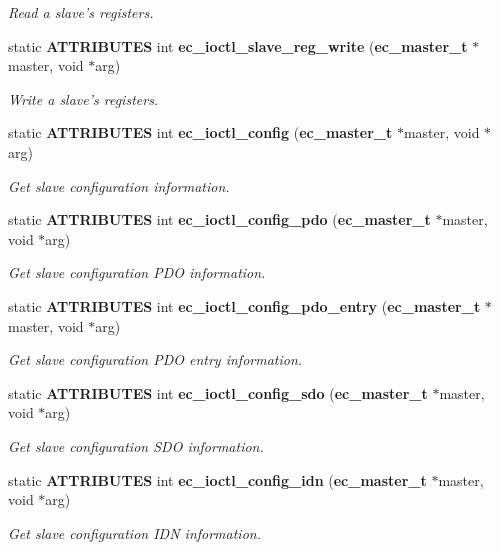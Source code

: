 \begin{DoxyCompactItemize}
\begin{DoxyCompactList}\small\item\em \-Read a slave's registers. \end{DoxyCompactList}\item 
static {\bf \-A\-T\-T\-R\-I\-B\-U\-T\-E\-S} int {\bf ec\-\_\-ioctl\-\_\-slave\-\_\-reg\-\_\-write} ({\bf ec\-\_\-master\-\_\-t} $\ast$master, void $\ast$arg)
\begin{DoxyCompactList}\small\item\em \-Write a slave's registers. \end{DoxyCompactList}\item 
static {\bf \-A\-T\-T\-R\-I\-B\-U\-T\-E\-S} int {\bf ec\-\_\-ioctl\-\_\-config} ({\bf ec\-\_\-master\-\_\-t} $\ast$master, void $\ast$arg)
\begin{DoxyCompactList}\small\item\em \-Get slave configuration information. \end{DoxyCompactList}\item 
static {\bf \-A\-T\-T\-R\-I\-B\-U\-T\-E\-S} int {\bf ec\-\_\-ioctl\-\_\-config\-\_\-pdo} ({\bf ec\-\_\-master\-\_\-t} $\ast$master, void $\ast$arg)
\begin{DoxyCompactList}\small\item\em \-Get slave configuration \-P\-D\-O information. \end{DoxyCompactList}\item 
static {\bf \-A\-T\-T\-R\-I\-B\-U\-T\-E\-S} int {\bf ec\-\_\-ioctl\-\_\-config\-\_\-pdo\-\_\-entry} ({\bf ec\-\_\-master\-\_\-t} $\ast$master, void $\ast$arg)
\begin{DoxyCompactList}\small\item\em \-Get slave configuration \-P\-D\-O entry information. \end{DoxyCompactList}\item 
static {\bf \-A\-T\-T\-R\-I\-B\-U\-T\-E\-S} int {\bf ec\-\_\-ioctl\-\_\-config\-\_\-sdo} ({\bf ec\-\_\-master\-\_\-t} $\ast$master, void $\ast$arg)
\begin{DoxyCompactList}\small\item\em \-Get slave configuration \-S\-D\-O information. \end{DoxyCompactList}\item 
static {\bf \-A\-T\-T\-R\-I\-B\-U\-T\-E\-S} int {\bf ec\-\_\-ioctl\-\_\-config\-\_\-idn} ({\bf ec\-\_\-master\-\_\-t} $\ast$master, void $\ast$arg)
\begin{DoxyCompactList}\small\item\em \-Get slave configuration \-I\-D\-N information. \end{DoxyCompactList}\item 

\end{DoxyCompactItemize}
